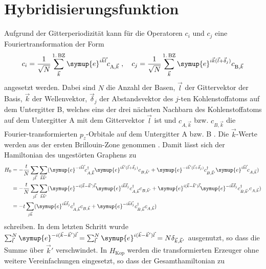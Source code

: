 \section{Hybridisierungsfunktion}
\label{sec:calc_greensfunction}
Aufgrund der Gitterperiodizität kann für die Operatoren $c_i$ und $c_j$ eine Fouriertransformation der Form 
\begin{equation}
    c_i = \frac{1}{\sqrt{N}} \sum_{\vec{k}}^{1. \, \text{BZ}} \symup{e}^{i\vec{k}\vec{l}} c_{\text{A}, \vec{k}} \; , 
    \quad c_j = \frac{1}{\sqrt{N}} \sum_{\vec{k}}^{1. \, \text{BZ}} \symup{e}^{i\vec{k}(\vec{l}+\vec{\delta}_j)} c_{\text{B}, \vec{k}} \label{eqn:fourier_ladder}
\end{equation}
angesetzt werden.
Dabei sind $N$ die Anzahl der Basen, $\vec{l}$ der Gittervektor der Basis, $\vec{k}$ der Wellenvektor, $\vec{\delta}_j$ der Abstandsvektor
des $j$-ten Kohlenstoffatoms auf dem Untergitter B, welches eins der drei nächsten Nachbarn des Kohlenstoffatoms auf dem Untergitter A mit dem Gittervektor $\vec{l}$ ist 
und $c_{A, \vec{k}}$ bzw. $c_{B, \vec{k}}$ die Fourier-transformierten $p_z$-Orbitale auf dem Untergitter A bzw. B \cite{anders-fkt}.
Die $\vec{k}$-Werte werden aus der ersten Brillouin-Zone genommen \cite{anders-fkt}.
Damit lässt sich der Hamiltonian des ungestörten Graphens zu 
\begin{align*}
    H_0 &= -\frac{t}{N} \sum_{j\vec{l}} \sum_{\vec{k}\vec{k}'} ( \symup{e}^{-i\vec{k}\vec{l}}c^\dagger_{A,\vec{k}} 
    \symup{e}^{i\vec{k}'(\vec{l}+\vec{\delta}_j)}c_{B,\vec{k}'} + \symup{e}^{-i\vec{k}'(\vec{l}+\vec{\delta}_j)} c^\dagger_{B,\vec{k}'} 
    \symup{e}^{i\vec{k}\vec{l}}c_{A,\vec{k}}) \\
    &= -\frac{t}{N} \sum_{j\vec{l}} \sum_{\vec{k}\vec{k}'} ( \symup{e}^{-i(\vec{k}- \vec{k}')\vec{l}}\symup{e}^{i\vec{k}\vec{\delta}_j}c^\dagger_{A,\vec{k}} c_{B,\vec{k}'} + 
    \symup{e}^{i(\vec{k}- \vec{k}')\vec{l}} \symup{e}^{-i\vec{k}\vec{\delta}_j} c^\dagger_{B,\vec{k}'}c_{A,\vec{k}}) \\
    &= -t \sum_{j\vec{k}} ( \symup{e}^{i\vec{k}\vec{\delta}_j}c^\dagger_{A,\vec{k}} c_{B,\vec{k}} + 
    \symup{e}^{-i\vec{k}\vec{\delta_j}} c^\dagger_{B,\vec{k}}c_{A,\vec{k}})
\end{align*}
schreiben.
In dem letzten Schritt wurde $\sum_{\vec{l}}^N \symup{e}^{-i(\vec{k}- \vec{k}')\vec{l}} 
= \sum_{\vec{l}}^N \symup{e}^{i(\vec{k}- \vec{k}')\vec{l}} = N\delta_{\vec{k}, \vec{k}'}$ ausgenutzt, so dass die Summe über $\vec{k}'$ verschwindet.
In $H_\text{Kop}$ werden die transformierten Erzeuger ohne weitere Vereinfachungen eingesetzt,  so dass der Gesamthamiltonian zu 
